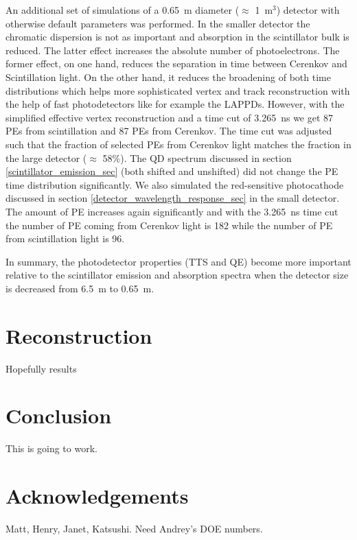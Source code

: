 \documentclass[aps,prc,twocolumn,groupedaddress,showpacs,amsmath,amssymb,floatfix,superscriptaddress]{revtex4}
\begin{document}
An additional set of simulations of a 0.65~m diameter ($\approx$ 1~m$^3$) detector with otherwise default parameters was performed. In the smaller detector the chromatic dispersion is not as important and absorption in the scintillator bulk is reduced. The latter effect increases the absolute number of photoelectrons. The former effect, on one hand, reduces the separation in time between Cerenkov and Scintillation light. On the other hand, it reduces the broadening of both time distributions which helps more sophisticated vertex and track reconstruction with the help of fast photodetectors like for example the LAPPDs. However, with the simplified effective vertex reconstruction and a time cut of 3.265~ns we get 87 PEs from scintillation and 87 PEs from Cerenkov. The time cut was adjusted such that the fraction of selected PEs from Cerenkov light matches the fraction in the large detector ($\approx$ 58\%). The QD spectrum discussed in section \ref{scintillator_emission_sec} (both shifted and unshifted) did not change the PE time distribution significantly. We also simulated the red-sensitive photocathode discussed in section \ref{detector_wavelength_response_sec} in the small detector. The amount of PE increases again significantly and with the 3.265~ns time cut the number of PE coming from Cerenkov light is 182 while the number of PE from scintillation light is 96. 

In summary, the photodetector properties (TTS and QE) become more important relative to the scintillator emission and absorption spectra when the detector size is decreased from 6.5~m to 0.65~m.


\section{Reconstruction}
\label{reconstruction_sec}
Hopefully results

\section{Conclusion}
This is going to work.

\section{Acknowledgements}
Matt, Henry, Janet, Katsushi. Need Andrey's DOE numbers.



\end{document}
